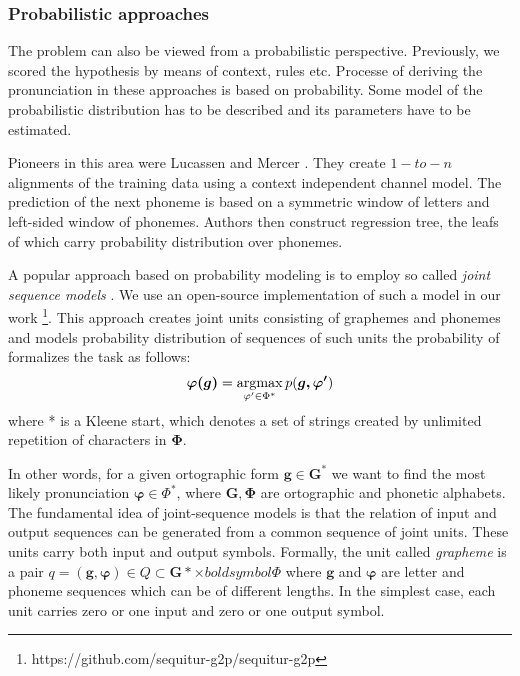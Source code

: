 \subsubsection{Probabilistic approaches}
The problem can also be viewed from a probabilistic perspective.
Previously, we scored the hypothesis by means of context, rules etc.
Processe of deriving the pronunciation in these approaches is based on probability.
Some model of the probabilistic distribution has to be described and its parameters have to be estimated.
\par
Pioneers in this area were Lucassen and Mercer \cite{lucassen1984information}.
They create $1-to-n$ alignments of the training data using a context independent channel model.
The prediction of the next phoneme is based on a symmetric window of letters and left-sided window of phonemes.
Authors then construct regression tree, the leafs of which carry probability distribution over phonemes.
\par
\label{g2p-jseq}
A popular approach based on probability modeling is to employ so called \textit{joint sequence models} \cite{bisani2008joint}.
We use an open-source implementation of such a model in our work \footnote{https://github.com/sequitur-g2p/sequitur-g2p}.
This approach creates joint units consisting of graphemes and phonemes and models probability distribution of sequences of such units the probability of formalizes the task as follows:
\begin{equation}
\boldsymbol{\varphi(g)} = \operatorname*{argmax}_{\varphi'\in\Phi^*} p(\boldsymbol{g,\varphi'})
\end{equation}
where * is a Kleene start, which denotes a set of strings created by unlimited repetition of characters in $\boldsymbol{\Phi}$.
\par
In other words, for a given ortographic form $\boldsymbol{g} \in \boldsymbol{G}^*$ we want to find the most likely pronunciation $\boldsymbol{\varphi} \in \Phi^*$, where $\boldsymbol{G}, \boldsymbol{\Phi}$ are ortographic and phonetic alphabets.
The fundamental idea of joint-sequence models is that the relation of input and output sequences can be generated from a common sequence of joint units.
These units carry both input and output symbols.
Formally, the unit called \textit{grapheme} is a pair $q = (\mathbf{g}, \mathbf{\varphi}) \in Q \subset \boldsymbol{G}* \times boldsymbol{\Phi}$ where $\mathbf{g}$ and $\mathbf{\varphi}$ are letter and phoneme sequences which can be of different lengths.
In the simplest case, each unit carries zero or one input and zero or one output symbol.
